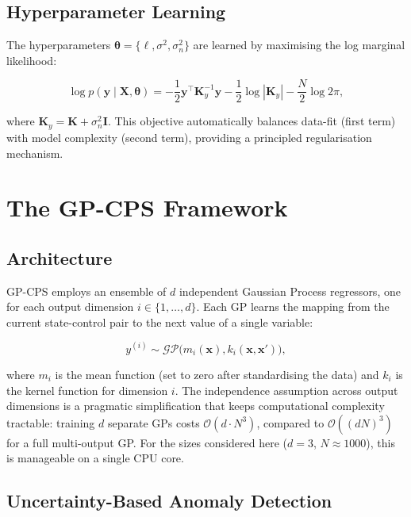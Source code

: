 \documentclass[conference]{IEEEtran}
\begin{document}
\subsection{Hyperparameter Learning}

The hyperparameters $\boldsymbol{\theta} = \{\ell, \sigma^2, \sigma_n^2\}$ are learned by maximising the log marginal likelihood:

\begin{equation}
\log p(\mathbf{y} \mid \mathbf{X}, \boldsymbol{\theta}) = -\frac{1}{2} \mathbf{y}^\top \mathbf{K}_y^{-1} \mathbf{y} - \frac{1}{2} \log |\mathbf{K}_y| - \frac{N}{2} \log 2\pi,
\label{eq:lml}
\end{equation}

where $\mathbf{K}_y = \mathbf{K} + \sigma_n^2 \mathbf{I}$. This objective automatically balances data-fit (first term) with model complexity (second term), providing a principled regularisation mechanism.

\section{The GP-CPS Framework}
\label{sec:method}

\subsection{Architecture}

GP-CPS employs an ensemble of $d$ independent Gaussian Process regressors, one for each output dimension $i \in \{1, \dots, d\}$. Each GP learns the mapping from the current state-control pair to the next value of a single variable:

\begin{equation}
y^{(i)} \sim \mathcal{GP}\big(m_i(\mathbf{x}), k_i(\mathbf{x}, \mathbf{x}')\big),
\label{eq:gp_ensemble}
\end{equation}

where $m_i$ is the mean function (set to zero after standardising the data) and $k_i$ is the kernel function for dimension $i$. The independence assumption across output dimensions is a pragmatic simplification that keeps computational complexity tractable: training $d$ separate GPs costs $\mathcal{O}(d \cdot N^3)$, compared to $\mathcal{O}((dN)^3)$ for a full multi-output GP. For the sizes considered here ($d=3$, $N \approx 1000$), this is manageable on a single CPU core.

\subsection{Uncertainty-Based Anomaly Detection}
\end{document}
